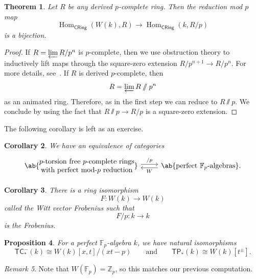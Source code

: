 \documentclass[10pt, oneside]{memoir}
\newtheorem{thm}{Theorem}[subsection]
\newtheorem{cor}[thm]{Corollary}
\newtheorem{prop}[thm]{Proposition}
\theoremstyle{definition}
\theoremstyle{remark}
\newtheorem{rmk}[thm]{Remark}
\theoremstyle{plain}
\theoremstyle{definition}
\theoremstyle{remark}
\newcommand{\Z}{\mathbb{Z}}
\newcommand{\F}{\mathbb{F}}
\newcommand{\ms}[1]{\mathsf{#1}}
\newcommand{\1}{\mathbf{1}}
\newcommand{\2}{\mathbf{2}}
\newcommand{\3}{\mathbf{3}}
\newcommand{\TC}{\ms{TC}}
\newcommand{\TP}{\ms{TP}}
\DeclareMathOperator{\Hom}{Hom}
\begin{document}
\begin{thm}
    Let \(R \) be any derived \(p \)-complete ring. Then the reduction mod \(p \) map
    \[ \Hom_{\ms{CRing}}(W(k), R) \to \Hom_{\ms{CRing}}(k, R/p) \]
    is a bijection.
\end{thm}

\begin{proof}
    If \(R = \varprojlim R/p^n \) is \(p \)-complete, then we use obstruction theory to inductively lift maps through the square-zero extension \(R/p^{n+1} \to R/p^n \). For more details, see~. If \(R \) is derived \(p \)-complete, then
    \[ R = \varprojlim R\sslash p^n \]
    as an animated ring. Therefore, as in the first step we can reduce to \(R \sslash p \). We conclude by using the fact that \(R \sslash p \to R/p \) is a square-zero extension.
\end{proof}

The following corollary is left as an exercise.
\begin{cor}
    We have an equivalence of categories
    \begin{equation*}
    \begin{tikzcd}
        \ab\{ \Centerstack{{\(p \)-torsion free \(p \)-complete rings} {with perfect mod-\(p \) reduction}} \} \ar[shift left=1]{r}{/p} & \ab\{\text{perfect \(\F_p \)-algebras} \} \ar[shift left=1]{l}{W}.
    \end{tikzcd}
    \end{equation*}
\end{cor}

\begin{cor}
    There is a ring isomorphism
    \[ F \colon W(k) \to W(k) \]
    called the \textit{Witt vector Frobenius} such that
    \[ F/p \colon k \to k \]
    is the Frobenius.
\end{cor}

\begin{prop}
    For a perfect \(\F_p \)-algebra \(k \), we have natural isomorphisms
    \[ \TC_*^-(k) \cong W(k)[x,t]/(xt-p) \qquad \text{and} \qquad \TP_*(k) \cong W(k)[t^{\pm}]. \]
\end{prop}

\begin{rmk}
    Note that \(W(\F_p) = \Z_p \), so this matches our previous computation.
\end{rmk}
\end{document}
